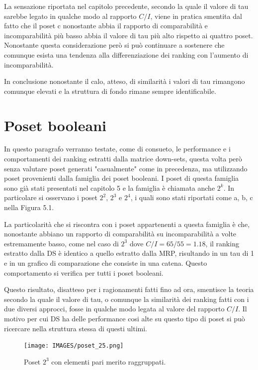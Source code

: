 \documentclass{report}
\begin{document}
La sensazione riportata nel capitolo precedente, secondo la quale il valore di tau sarebbe legato in qualche modo al rapporto $C/I$, viene in pratica smentita dal fatto che il poset c nonostante abbia il rapporto di comparabilità e incomparabilità più basso abbia il valore di tau più alto rispetto ai quattro poset. Nonostante questa considerazione però si può continuare a sostenere che comunque esista una tendenza alla differenziazione dei ranking con l'aumento di incomparabilità.


In conclusione nonostante il calo, atteso, di similarità i valori di tau rimangono comunque elevati e la struttura di fondo rimane sempre identificabile.

\section{Poset booleani}
In questo paragrafo verranno testate, come di consueto, le performance e i comportamenti dei ranking estratti dalla matrice down-sets, questa volta però senza valutare poset generati "casualmente" come in precedenza, ma utilizzando poset provenienti dalla famiglia dei poset booleani. I poset di questa famiglia sono già stati presentati nel capitolo 5 e la famiglia è chiamata anche $2^k$. In particolare si osservano i poset $2^2$, $2^3$ e $2^4$, i quali sono stati riportati come a, b, c nella Figura 5.1.


La particolarità che si riscontra con i poset appartenenti a questa famiglia è che, nonostante abbiano un rapporto di comparabilità su incomparabilità a volte estremamente basso, come nel caso di $2^3$ dove $C/I=65/55=1.18$, il ranking estratto dalla DS è identico a quello estratto dalla MRP, risultando in un tau di 1 e in un grafico di comparazione che consiste in una catena. Questo comportamento si verifica per tutti i poset booleani.


Questo risultato, disatteso per i ragionamenti fatti fino ad ora, smentisce la teoria secondo la quale il valore di tau, o comunque la similarità dei ranking fatti con i due diversi approcci, fosse in qualche modo legata al valore del rapporto $C/I$. Il motivo per cui DS ha delle performance cosi alte su questo tipo di poset si può ricercare nella struttura stessa di questi ultimi. 

\begin{figure}[H]
    \centering
    \texttt{[image: IMAGES/poset\_25.png]}
    \caption{Poset $2^3$ con elementi pari merito raggruppati.}
    \label{fig:roc}
\end{figure}
\end{document}
